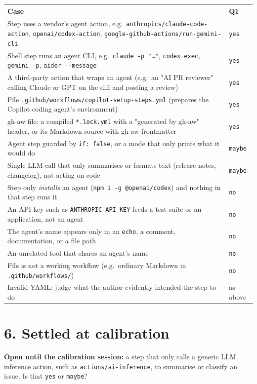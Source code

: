 \documentclass[10pt,a4paper]{article}
\newcommand{\val}[1]{\texttt{#1}}
\begin{document}
\begin{tabularx}{\linewidth}{@{}L l@{}}
\toprule
\textbf{Case} & \textbf{Q1} \\
\midrule
Step uses a vendor's agent action, e.g.\ \val{anthropics/claude-code-action}, \val{openai/codex-action}, \val{google-github-actions/run-gemini-cli} & \val{yes} \\
Shell step runs an agent CLI, e.g.\ \val{claude -p "\dots"}, \val{codex exec}, \val{gemini -p}, \val{aider -{}-message} & \val{yes} \\
A third-party action that wraps an agent (e.g.\ an "AI PR reviewer" calling Claude or GPT on the diff and posting a review) & \val{yes} \\
File \val{.github/workflows/copilot-setup-steps.yml} (prepares the Copilot coding agent's environment) & \val{yes} \\
gh-aw file: a compiled \val{*.lock.yml} with a "generated by gh-aw" header, or its Markdown source with gh-aw frontmatter & \val{yes} \\
Agent step guarded by \val{if: false}, or a mode that only prints what it would do & \val{maybe} \\
Single LLM call that only summarises or formats text (release notes, changelog), not acting on code & \val{maybe} \\
Step only \emph{installs} an agent (\val{npm i -g @openai/codex}) and nothing in that step runs it & \val{no} \\
An API key such as \val{ANTHROPIC\_API\_KEY} feeds a test suite or an application, not an agent & \val{no} \\
The agent's name appears only in an \val{echo}, a comment, documentation, or a file path & \val{no} \\
An unrelated tool that shares an agent's name & \val{no} \\
File is not a working workflow (e.g.\ ordinary Markdown in \val{.github/workflows/}) & \val{no} \\
Invalid YAML: judge what the author evidently intended the step to do & as above \\
\bottomrule
\end{tabularx}

\section*{6. Settled at calibration}

\textbf{Open until the calibration session:} a step that only calls a generic
LLM inference action, such as \val{actions/ai-inference}, to summarise or
classify an issue. Is that \val{yes} or \val{maybe}?
\end{document}
